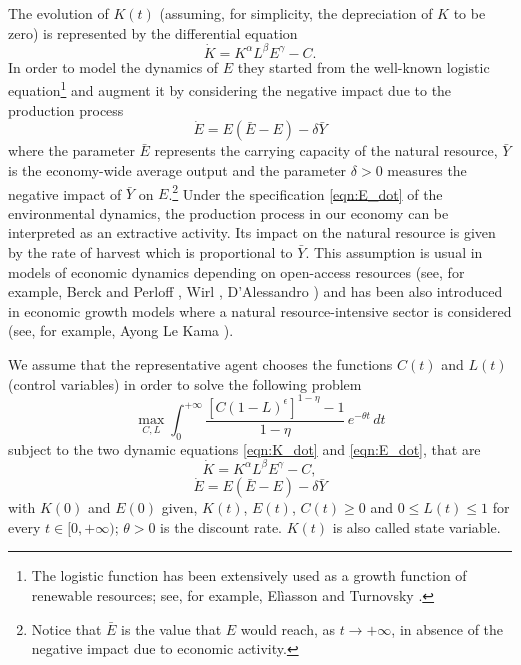 The evolution of $K(t)$ (assuming, for simplicity, the depreciation of $K$ to be zero) is represented by the differential equation
\begin{equation} \label{eqn:K_dot}
	\dot{K} = K^\alpha L^\beta E^\gamma -C.
\end{equation}
In order to model the dynamics of $E$ they started from the well-known logistic equation\footnote{The logistic function has been extensively used as a growth function of renewable resources; see, for example, Elìasson and Turnovsky \cite{eliasson_renewable_2004}.} and augment it by considering the negative impact due to the production process
\begin{equation} \label{eqn:E_dot}
	\dot{E} = E(\bar{E}-E)-\delta\bar{Y}
\end{equation}
where the parameter $\bar{E}$ represents the carrying capacity of the natural resource, $\bar{Y}$ is the economy-wide average output and the parameter $\delta>0$ measures the negative impact of $\bar{Y}$ on $E$.\footnote{Notice that $\bar{E}$ is the value that $E$ would reach, as $t\rightarrow +\infty$, in absence of the negative impact due to economic activity.} Under the specification \eqref{eqn:E_dot} of the environmental dynamics, the production process in our economy can be interpreted as an extractive activity. Its impact on the natural resource is given by the rate of harvest which is proportional to $\bar{Y}$. This assumption is usual in models of economic dynamics depending on open-access resources (see, for example, Berck and Perloff \cite{berck_open-access_1984}, Wirl \cite{wirl_cyclical_1995}, D'Alessandro \cite{dalessandro_non-linear_2007}) and has been also introduced in economic growth models where a natural resource-intensive sector is considered (see, for example, Ayong Le Kama \cite{ayong_le_kama_sustainable_2001}).

We assume that the representative agent chooses the functions $C(t)$ and $L(t)$ (control variables) in order to solve the following problem
\begin{equation} \label{max_utility_funct}
	\max_{C,L} \int_{0}^{+\infty} \frac{[C(1-L)^{\epsilon}]^{1-\eta} -1}{1-\eta}\, e^{-\theta t} \,dt 
\end{equation}
subject to the two dynamic equations \eqref{eqn:K_dot} and \eqref{eqn:E_dot}, that are
$$\dot{K} = K^\alpha L^\beta E^\gamma -C,$$
$$\dot{E} = E(\bar{E}-E)-\delta\bar{Y}$$ 
with $K(0)$ and $E(0)$ given, $K(t)$, $E(t)$, $C(t)\geq0$ and $0\leq L(t)\leq 1$ for every $t\in [0,+\infty)$; $\theta>0$ is the discount rate. $K(t)$ is also called state variable.

